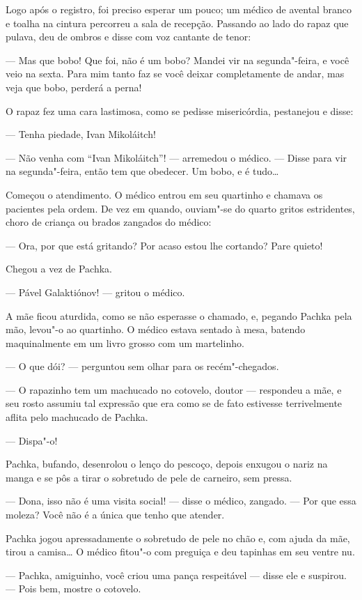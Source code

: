 Logo após o registro, foi preciso esperar um pouco; um médico de avental
branco e toalha na cintura percorreu a sala de recepção. Passando ao
lado do rapaz que pulava, deu de ombros e disse com voz cantante de
tenor:

--- Mas que bobo! Que foi, não é um bobo? Mandei vir na segunda"-feira, e
você veio na sexta. Para mim tanto faz se você deixar completamente de
andar, mas veja que bobo, perderá a perna!

O rapaz fez uma cara lastimosa, como se pedisse misericórdia, pestanejou
e disse:

--- Tenha piedade, Ivan Mikoláitch!

--- Não venha com ``Ivan Mikoláitch''! --- arremedou o médico. --- Disse
para vir na segunda"-feira, então tem que obedecer. Um bobo, e é tudo\ldots{}

Começou o atendimento. O médico entrou em seu quartinho e chamava os
pacientes pela ordem. De vez em quando, ouviam"-se do quarto gritos
estridentes, choro de criança ou brados zangados do médico:

--- Ora, por que está gritando? Por acaso estou lhe cortando? Pare
quieto!

Chegou a vez de Pachka.

--- Pável Galaktiónov! --- gritou o médico.

A mãe ficou aturdida, como se não esperasse o chamado, e, pegando Pachka
pela mão, levou"-o ao quartinho. O médico estava sentado à mesa, batendo
maquinalmente em um livro grosso com um martelinho.

--- O que dói? --- perguntou sem olhar para os recém"-chegados.

--- O rapazinho tem um machucado no cotovelo, doutor --- respondeu a mãe, e seu rosto assumiu tal
expressão que era como se de fato estivesse terrivelmente aflita pelo machucado de Pachka.

--- Dispa"-o!

Pachka, bufando, desenrolou o lenço do pescoço, depois enxugou o nariz
na manga e se pôs a tirar o sobretudo de pele de carneiro, sem pressa.

--- Dona, isso não é uma visita social! --- disse o médico, zangado. ---
Por que essa moleza? Você não é a única que tenho que atender.

Pachka jogou apressadamente o sobretudo de pele no chão e, com ajuda da
mãe, tirou a camisa\ldots{} O médico fitou"-o com preguiça e deu tapinhas em
seu ventre nu.

--- Pachka, amiguinho, você criou uma pança respeitável --- disse ele e
suspirou. --- Pois bem, mostre o cotovelo.

